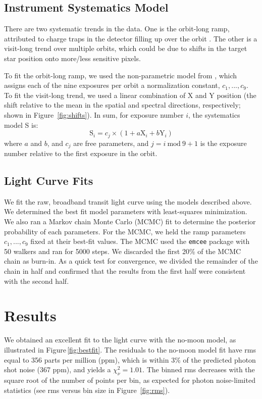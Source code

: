 \documentclass[twocolumn]{aastex62}
\newcommand{\Mod}[1]{\ \mathrm{mod}\ #1}
\begin{document}
\subsection{Instrument Systematics Model}
There are two systematic trends in the data. One is the orbit-long ramp, attributed to charge traps in the detector filling up over the orbit \citep{zhou17}. The other is a visit-long trend over multiple orbits, which could be due to shifts in the target star position onto more/less sensitive pixels.

To fit the orbit-long ramp, we used the non-parametric model from \cite{teachey18b}, which assigns each of the nine exposures per orbit a normalization constant, $c_1, ..., c_9$. To fit the visit-long trend, we used a linear combination of X and Y position (the shift relative to the mean in the spatial and spectral directions, respectively; shown in Figure~\ref{fig:shifts}).  In sum, for exposure number $i$, the systematics model S is:
\begin{equation}
\label{eq:sys}
    \mathrm{S}_i = c_{j}\times(1 + a\mathrm{X}_i + b\mathrm{Y}_i) 
\end{equation}
where $a$ and $b$, and $c_j$ are free parameters, and $j = i\Mod9 + 1$ is the exposure number relative to the first exposure in the orbit.


\subsection{Light Curve Fits}
We fit the raw, broadband transit light curve using the models described above.  We determined the best fit model parameters with least-squares minimization.  We also ran a Markov chain Monte Carlo (MCMC) fit to determine the posterior probability of each parameters. For the MCMC, we held the ramp parameters $c_1, ..., c_9$ fixed at their best-fit values.  The MCMC used the \texttt{emcee} package \citep{foremanmackey13} with 50 walkers and ran for 5000 steps. We discarded the first 20\% of the MCMC chain as burn-in. As a quick test for convergence, we divided the remainder of the chain in half and confirmed that the results from the first half were consistent with the second half.


\section{Results}
We obtained an excellent fit to the light curve with the no-moon model, as illustrated in  Figure\,\ref{fig:bestfit}. The residuals to the no-moon model fit have rms equal to 356 parts per million (ppm), which is within 3\% of the predicted photon shot noise (367 ppm), and yields a $\chi_\nu^2 = 1.01$. The binned rms decreases with the square root of the number of points per bin, as expected for photon noise-limited statistics (see rms versus bin size in Figure~\ref{fig:rms}).
\end{document}
